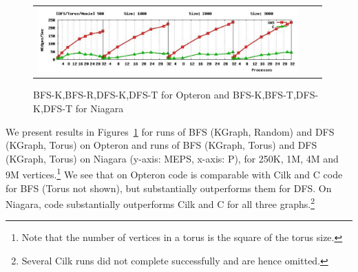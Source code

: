 \begin{figure}
\begin{center}
\begin{tabular}{ccc}
\includegraphics[width=10cm]{new/dfs_torus_moxie_color.pdf}\\
\end{tabular}
\caption{BFS-K,BFS-R,DFS-K,DFS-T for Opteron and 
BFS-K,BFS-T,DFS-K,DFS-T for Niagara}\label{figure-results}
\end{center}
\end{figure}

%

We present results in Figures~\ref{figure-results} for runs of BFS
(KGraph, Random) and DFS (KGraph, Torus) on Opteron and runs of BFS
(KGraph, Torus) and DFS (KGraph, Torus) on Niagara (y-axis: MEPS,
x-axis: P), for 250K, 1M, 4M and 9M vertices.\footnote{Note that the number
of vertices in a torus is the square of the torus size.} We see that
on Opteron \XWS{} code is comparable with Cilk and C code for BFS
(Torus not shown), but substantially outperforms them for DFS. On
Niagara, \XWS{} code substantially outperforms Cilk and C for all
three graphs.\footnote{Several Cilk runs did not complete successfully
and are hence omitted.}

